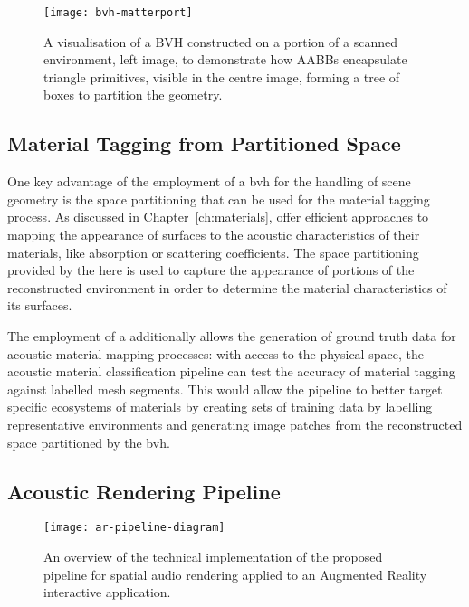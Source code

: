 \begin{figure}[htb]
    \centering
    \texttt{[image: bvh-matterport]}
    \caption[A Bounding Volume Hierarchy computed on a real environment]{A visualisation of a BVH constructed on a portion of a scanned environment, left image, to demonstrate how AABBs encapsulate triangle primitives, visible in the centre image, forming a tree of boxes to partition the geometry.}
\label{fig:bvh-visualisation}
\end{figure}

\subsection{Material Tagging from Partitioned Space}
One key advantage of the employment of a \acrshort{bvh} for the handling of scene geometry is the space partitioning that can be used for the material tagging process. As discussed in Chapter~\ref{ch:materials},  offer efficient approaches to mapping the appearance of surfaces to the acoustic characteristics of their materials, like absorption or scattering coefficients. The space partitioning provided by the  here is used to capture the appearance of portions of the reconstructed environment in order to determine the material characteristics of its surfaces.\par
The employment of a  additionally allows the generation of ground truth data for acoustic material mapping processes: with access to the physical space, the acoustic material classification pipeline can test the accuracy of material tagging against labelled mesh segments. This would allow the pipeline to better target specific ecosystems of materials by creating sets of training data by labelling representative environments and generating image patches from the reconstructed space partitioned by the \acrshort{bvh}.

\subsection{Acoustic Rendering Pipeline}
\begin{figure}[htb]
    \centering
    \texttt{[image: ar-pipeline-diagram]}
    \caption[Proposed acoustic rendering pipeline --- integration with game engines]{An overview of the technical implementation of the proposed pipeline for spatial audio rendering applied to an Augmented Reality interactive application. }
    \label{fig:ar-pipeline-overview}
\end{figure}

